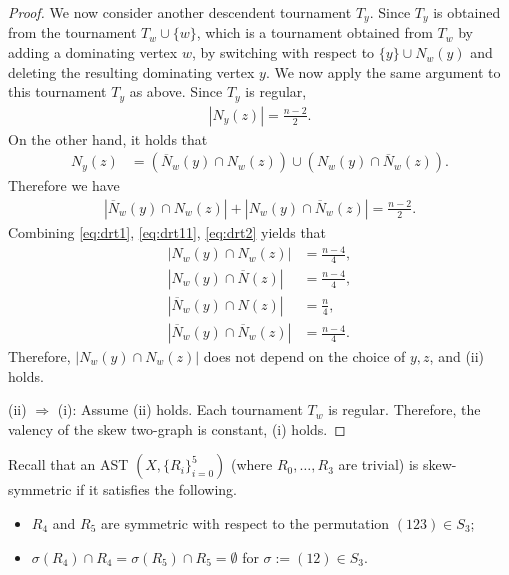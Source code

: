 \documentclass[11pt,oneside]{amsart}
\begin{document}
{\begin{proof}
    We now consider another descendent tournament $T_y$. Since $T_y$ is obtained from the tournament $T_w \cup\{w\}$, which is a tournament obtained from $T_w$ by adding a dominating vertex $w$, by switching with respect to $\{y\}\cup N_w(y)$ and deleting the resulting dominating vertex $y$.  
    We now apply the same argument to this tournament $T_y$ as above. 
    Since $T_y$ is regular, 
    \begin{align*}
        |N_y(z)|=\frac{n-2}{2}.     
    \end{align*}
    On the other hand, it holds that 
    \begin{align*}
        N_y(z)&=(\overline{N}_w(y)\cap N_w(z))\cup(N_w(y)\cap \overline{N}_w(z)).  
    \end{align*}
    Therefore we have 
    \begin{align}\label{eq:drt2}
        |\overline{N}_w(y)\cap N_w(z)|+|N_w(y)\cap \overline{N}_w(z)|=\frac{n-2}{2}.  
    \end{align}
    Combining \eqref{eq:drt1}, \eqref{eq:drt11}, \eqref{eq:drt2} yields that 
    \begin{align*}
        |N_w(y)\cap N_w(z)|&=\frac{n-4}{4},\\
        |N_w(y)\cap \overline{N}(z)|&=\frac{n-4}{4},\\
        |\overline{N}_w(y)\cap N(z)|&=\frac{n}{4},\\
        |\overline{N}_w(y)\cap \overline{N}_w(z)|&=\frac{n-4}{4}.
    \end{align*}
    Therefore, $|N_w(y)\cap N_w(z)|$ does not depend on the choice of $y,z$, and (ii) holds. 
    
    (ii) $\Rightarrow$ (i): 
    Assume (ii) holds. Each tournament $T_w$ is regular. Therefore, the valency of the skew two-graph is constant, (i) holds.   
\end{proof}

Recall that an AST $(X,\{R_i\}_{i=0}^5)$ (where $R_0,\dots,R_3$ are trivial) is skew-symmetric if 
it satisfies the following.
\begin{itemize}
    \item [(SS1)] $R_4$ and $R_5$ are symmetric with respect to the permutation $(123)\in S_3$;
    \item [(SS2)] $\sigma(R_4) \cap R_4=\sigma(R_5) \cap R_5=\emptyset$ for $\sigma:=(12)\in S_3$.    
\end{itemize} 


}
\end{document}
